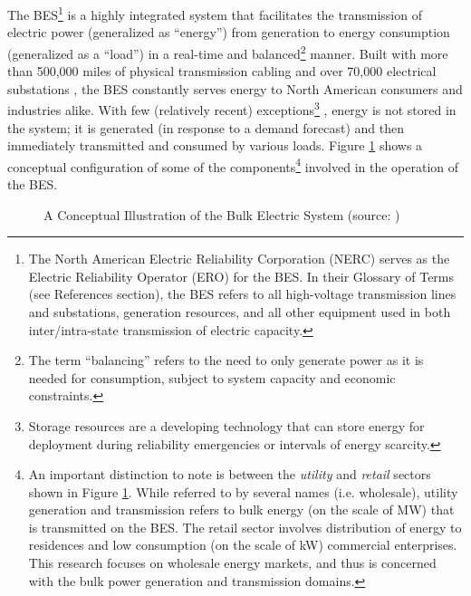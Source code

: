 The BES\footnote{The North American Electric Reliability Corporation (NERC) serves as the Electric Reliability Operator (ERO) for the BES. In their Glossary of Terms (see References section), the BES refers to all high-voltage transmission lines and substations, generation resources, and all other equipment used in both inter/intra-state transmission of electric capacity.}
is a highly integrated system that facilitates the transmission of electric power (generalized as “energy”) from generation to energy consumption (generalized as a “load”) in a real-time and balanced\footnote{The term “balancing” refers to the need to only generate power as it is needed for consumption, subject to system capacity and economic constraints.}
manner. Built with more than 500,000 miles \cite{nrel1} of physical transmission cabling and over 70,000 electrical substations \cite{cisa-gov}, the BES constantly serves energy to North American consumers and industries alike. With few (relatively recent) exceptions\footnote{Storage resources are a developing technology that can store energy for deployment during reliability emergencies or intervals of energy scarcity.}
, energy is not stored in the system; it is generated (in response to a demand forecast) and then immediately transmitted and consumed by various loads. Figure \ref{fig:BES_1} shows a conceptual configuration of some of the components\footnote{An important distinction to note is between the \textit{utility} and \textit{retail} sectors shown in Figure \ref{fig:BES_1}. While referred to by several names (i.e. wholesale), utility generation and transmission refers to bulk energy (on the scale of MW) that is transmitted on the BES. The retail sector involves distribution of energy to residences and low consumption (on the scale of kW) commercial enterprises. This research focuses on wholesale energy markets, and thus is concerned with the bulk power generation and transmission domains.}
involved in the operation of the BES. \cite{devasia}

\begin{figure}
\centering
{}
\caption{A Conceptual Illustration of the Bulk Electric System (source: \cite{devasia})} 
\label{fig:BES_1}
\end{figure}

